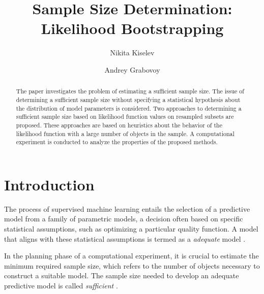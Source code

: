 \documentclass[runningheads]{llncs}
\begin{document}
%
\title{Sample Size Determination:\\Likelihood Bootstrapping}
%
%
\author{Nikita Kiselev \and Andrey Grabovoy}
%
%
%
\maketitle %
%
\begin{abstract}
The paper investigates the problem of estimating a sufficient sample size. The issue of determining a sufficient sample size without specifying a statistical hypothesis about the distribution of model parameters is considered. Two approaches to determining a sufficient sample size based on likelihood function values on resampled subsets are proposed. These approaches are based on heuristics about the behavior of the likelihood function with a large number of objects in the sample. A computational experiment is conducted to analyze the properties of the proposed methods.

\end{abstract}
%
%
%
\section{Introduction}
The process of supervised machine learning entails the selection of a predictive model from a family of parametric models, a decision often based on specific statistical assumptions, such as optimizing a particular quality function. A model that aligns with these statistical assumptions is termed as a \textit{adequate} model \cite{bies2006genetic,cawley2010over,raschka2018model}.

In the planning phase of a computational experiment, it is crucial to estimate the minimum required sample size, which refers to the number of objects necessary to construct a suitable model. The sample size needed to develop an adequate predictive model is called \textit{sufficient} \cite{byrd2012sample,figueroa2012predicting,balki2019sample}. 
\end{document}

